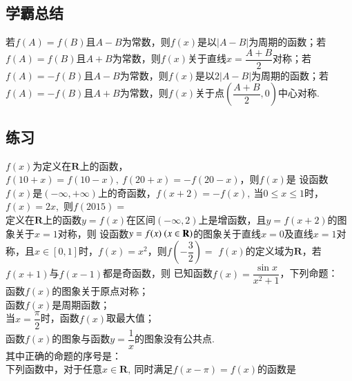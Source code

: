 \documentclass{BHCexam}
\begin{document}
\subsection{学霸总结}
\begin{spacing}{2}
若$ f(A)=f(B) $且$ A-B $为常数，则$ f(x) $是以$ \left|A-B\right| $为周期的函数；若$ f(A)=f(B) $且$ A+B $为常数，则$ f(x) $关于直线$ x=\dfrac{A+B}{2} $对称；若$ f(A)=-f(B) $且$ A-B $为常数，则$ f(x) $是以$ 2\left|A-B\right| $为周期的函数；若$ f(A)=-f(B) $且$ A+B $为常数，则$f(x)$关于点$ \left(\dfrac{A+B}{2},0\right) $中心对称.
\end{spacing}
\subsection{练习}
\begin{questions}
\qs $f(x)$为定义在$ \mathbf{R} $上的函数，$ f(10+x)=f(10-x) ,~f(20+x)=-f(20-x)$，则$f(x)$是\xx
{} 
\qs 设函数$f(x)$是$ \left(-\infty,+\infty\right) $上的奇函数，$ f(x+2)=-f(x) ,~$当$ 0\le x\le 1 $时，$f(x)=2x$,~则$f(2015)=$\\\mbox{\hspace{1em}}\hfill\xx
{}
\qs 定义在$ \mathbf{R} $上的函数$ y=f(x) $在区间$ \left(-\infty,2\right) $上是增函数，且$ y=f(x+2) $的图象关于$ x=1 $对称，则\xx
{}
\qs 设函数$y=f(x)~(x\in\mathbf{R})$的图象关于直线$ x=0 $及直线$ x=1 $对称，且$ x\in \left[0,1\right] $时，$f(x)=x^2$，则$ f\left(-\dfrac{3}{2}\right) =$\xx
{}
\qs $f(x)$的定义域为$\mathbf{R}$，若$f(x+1)$与$f(x-1)$都是奇函数，则\xx
{} 
\qs 已知函数$f(x)=\dfrac{ \sin x}{x^2+1 }$，下列命题：\\
 函数$f(x)$的图象关于原点对称；\\
 函数$f(x)$是周期函数；\\
 当$ x=\dfrac{\pi}{2} $时，函数$f(x)$取最大值；\\
 函数$f(x)$的图象与函数$ y=\dfrac{1}{x} $的图象没有公共点.\\
其中正确的命题的序号是：\\
\qs 下列函数中，对于任意$ x\in \mathbf{R} ,~$同时满足$f(x-\pi)=f(x)$的函数是\xx
{}

\end{questions}
\end{document}
